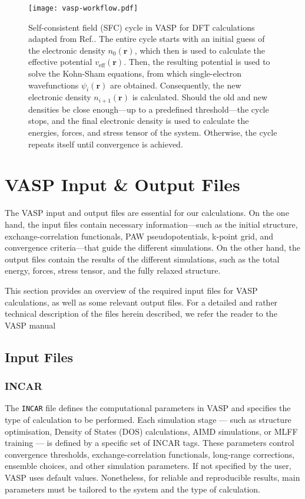 \begin{figure}[h]
    \centering
    \texttt{[image: vasp-workflow.pdf]}
    \caption{
        Self-consistent field (SFC) cycle in VASP for DFT calculations adapted from Ref.\supercite{sholl2023density}. The entire cycle starts with an initial guess of the electronic density $n_0(\mathbf{r})$, which then is used to calculate the effective potential $v_{\text{eff}}(\mathbf{r})$. Then, the resulting potential is used to solve the Kohn-Sham equations, from which single-electron wavefunctions $\psi_i(\mathbf{r})$ are obtained. Consequently, the new electronic density $n_{i+1}(\mathbf{r})$ is calculated. Should the old and new densities be close enough---up to a predefined threshold---the cycle stops, and the final electronic density is used to calculate the energies, forces, and stress tensor of the system. Otherwise, the cycle repeats itself until convergence is achieved. 
    }
    \label{fig:vasp_workflow}
\end{figure}

\section{VASP Input \& Output Files}
The VASP input and output files are essential for our calculations. On the one hand, the input files contain necessary information---such as the initial structure, exchange-correlation functionals, PAW pseudopotentials, k-point grid, and convergence criteria---that guide the different simulations. On the other hand, the output files contain the results of the different simulations, such as the total energy, forces, stress tensor, and the fully relaxed structure.

This section provides an overview of the required input files for VASP calculations, as well as some relevant output files. For a detailed and rather technical description of the files herein described, we refer the reader to the VASP manual\supercite{zotero-item-672}

\subsection{Input Files}
\subsubsection{INCAR}
The \texttt{INCAR} file defines the computational parameters in VASP and specifies the type of calculation to be performed. Each simulation stage — such as structure optimisation, Density of States (DOS) calculations, AIMD simulations, or MLFF training — is defined by a specific set of INCAR tags. These parameters control convergence thresholds, exchange-correlation functionals, long-range corrections, ensemble choices, and other simulation parameters. If not specified by the user, VASP uses default values. Nonetheless, for reliable and reproducible results, main parameters must be tailored to the system and the type of calculation.


